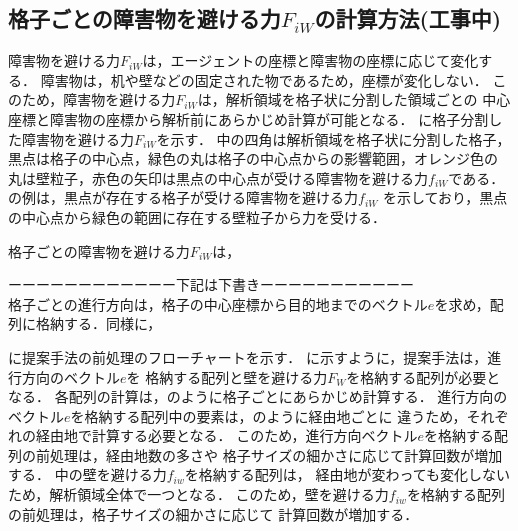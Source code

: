 

\subsection{格子ごとの障害物を避ける力$F_{iW}$の計算方法(工事中)}
障害物を避ける力$F_{iW}$は，エージェントの座標と障害物の座標に応じて変化する．
障害物は，机や壁などの固定された物であるため，座標が変化しない．
このため，障害物を避ける力$F_{iW}$は，解析領域を格子状に分割した領域ごとの
中心座標と障害物の座標から解析前にあらかじめ計算が可能となる．
に格子分割した障害物を避ける力$F_{iW}$を示す．
中の四角は解析領域を格子状に分割した格子，
黒点は格子の中心点，緑色の丸は格子の中心点からの影響範囲，オレンジ色の
丸は壁粒子，赤色の矢印は黒点の中心点が受ける障害物を避ける力$f_{iW}$である．
の例は，黒点が存在する格子が受ける障害物を避ける力$f_{iW}$
を示しており，黒点の中心点から緑色の範囲に存在する壁粒子から力を受ける．

格子ごとの障害物を避ける力$F_{iW}$は，


ーーーーーーーーーーーー下記は下書きーーーーーーーーーーー\\

格子ごとの進行方向は，格子の中心座標から目的地までのベクトル$e$を求め，配列に格納する．同様に，


に提案手法の前処理のフローチャートを示す．
に示すように，提案手法は，進行方向のベクトル$e$を
格納する配列と壁を避ける力$F_W$を格納する配列が必要となる．
各配列の計算は，のように格子ごとにあらかじめ計算する．
進行方向のベクトル$e$を格納する配列中の要素は，のように経由地ごとに
違うため，それぞれの経由地で計算する必要となる．
このため，進行方向ベクトル$e$を格納する配列の前処理は，経由地数の多さや
格子サイズの細かさに応じて計算回数が増加する．
中の壁を避ける力$f_{iw}$を格納する配列は，
経由地が変わっても変化しないため，解析領域全体で一つとなる．
このため，壁を避ける力$f_{iw}$を格納する配列の前処理は，格子サイズの細かさに応じて
計算回数が増加する．

